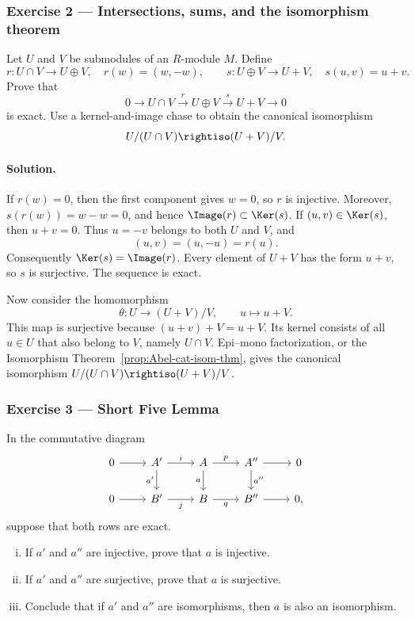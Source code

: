 \subsubsection*{Exercise 2 --- Intersections, sums, and the isomorphism theorem}
\hypertarget{o014.mastery.diagram-chasing.001.ex02}{ }
\label{mastery:diagram-chasing-001-ex02}

Let $U$ and $V$ be submodules of an $R$-module $M$. Define
\[
	r:U\cap V\longrightarrow U\oplus V,\quad r(w)=(w,-w),
	\qquad
	s:U\oplus V\longrightarrow U+V,\quad s(u,v)=u+v.
\]
Prove that
\[
	0\longrightarrow U\cap V\xrightarrow{r}U\oplus V
	\xrightarrow{s}U+V\longrightarrow0
\]
is exact. Use a kernel-and-image chase to obtain the canonical isomorphism
\[
	U/(U\cap V)\rightiso (U+V)/V.
\]

\paragraph{Solution.}
\hypertarget{o014.mastery.diagram-chasing.001.sol02}{ }
If $r(w)=0$, then the first component gives $w=0$, so $r$ is injective.
Moreover, $s(r(w))=w-w=0$, and hence $\Image(r)\subset\Ker(s)$. If
$(u,v)\in\Ker(s)$, then $u+v=0$. Thus $u=-v$ belongs to both $U$ and $V$,
and
\[
	(u,v)=(u,-u)=r(u).
\]
Consequently $\Ker(s)=\Image(r)$. Every element of $U+V$ has the form
$u+v$, so $s$ is surjective. The sequence is exact.

Now consider the homomorphism
\[
	\theta:U\longrightarrow (U+V)/V,\qquad u\longmapsto u+V.
\]
This map is surjective because $(u+v)+V=u+V$. Its kernel consists of all
$u\in U$ that also belong to $V$, namely $U\cap V$. Epi--mono
factorization, or the Isomorphism Theorem~\ref{prop:Abel-cat-isom-thm},
gives the canonical isomorphism
$U/(U\cap V)\rightiso (U+V)/V$.

\subsubsection*{Exercise 3 --- Short Five Lemma}
\hypertarget{o014.mastery.diagram-chasing.001.ex03}{ }
\label{mastery:diagram-chasing-001-ex03}

In the commutative diagram
\[
\begin{tikzcd}
	0 \arrow[r] & A' \arrow[r, "i"] \arrow[d, "a'"'] & A \arrow[r, "p"] \arrow[d, "a"'] & A'' \arrow[r] \arrow[d, "a''"] & 0 \\
	0 \arrow[r] & B' \arrow[r, "j"'] & B \arrow[r, "q"'] & B'' \arrow[r] & 0,
\end{tikzcd}
\]
suppose that both rows are exact.
\begin{enumerate}[(i)]
	\item If $a'$ and $a''$ are injective, prove that $a$ is injective.
	\item If $a'$ and $a''$ are surjective, prove that $a$ is surjective.
	\item Conclude that if $a'$ and $a''$ are isomorphisms, then $a$ is
	also an isomorphism.
\end{enumerate}

